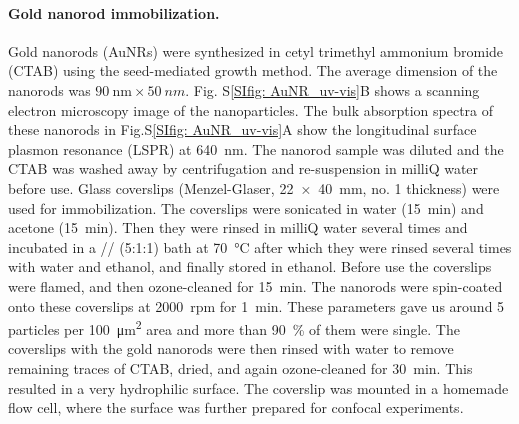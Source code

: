 \paragraph*{Gold nanorod immobilization.}
Gold nanorods (AuNRs) were synthesized in cetyl trimethyl ammonium bromide (CTAB) using the seed-mediated growth method.\cite{nikoobakht2003preparation}
The average dimension of the nanorods was $\SI{90}{\nm} \times \SI{50}{nm}$. Fig. S\ref{SIfig: AuNR_uv-vis}B shows a scanning electron microscopy image of the nanoparticles.
The bulk absorption spectra of these nanorods in Fig.S\ref{SIfig: AuNR_uv-vis}A show the longitudinal surface plasmon resonance (LSPR) 
at \SI{640}{\nm}. The nanorod sample was diluted and the CTAB was washed away by centrifugation and re-suspension in milliQ water before use.
Glass coverslips (Menzel-Glaser, \SI[product-units=repeat]{22x40}{\mm}, no. 1 thickness) were used for immobilization.
The coverslips were sonicated in water (\SI{15}{\minute}) and acetone (\SI{15}{\minute}).
Then they were rinsed in milliQ water several times and incubated in a // (5:1:1) bath at \SI{70}{\celsius} after which they were rinsed several times with water and ethanol, and finally stored in ethanol.
Before use the coverslips were flamed, and then ozone-cleaned for \SI{15}{\minute}.
The nanorods were spin-coated onto these coverslips at \SI{2000}{rpm} for \SI{1}{\minute}. 
These parameters gave us around 5 particles per \SI{100}{\um\squared} area and more than \SI{90}{\percent} of them were single. 
The coverslips with the gold nanorods were then rinsed with water to remove remaining traces of CTAB, dried, and again ozone-cleaned for \SI{30}{\minute}.
This resulted in a very  hydrophilic surface. The coverslip was mounted in a homemade flow cell, where the surface was further prepared for confocal experiments.


